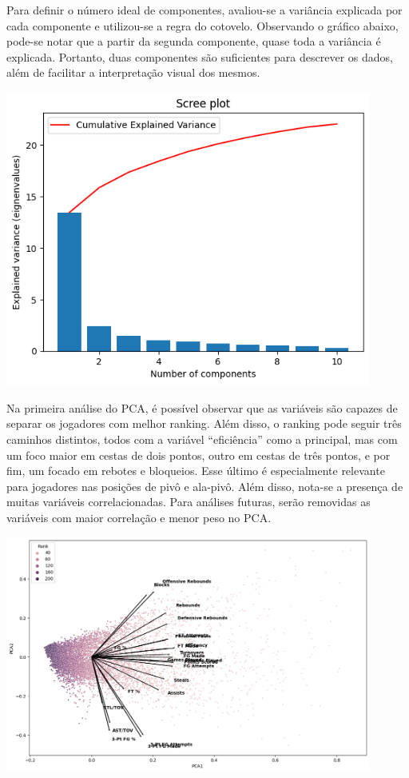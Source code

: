 \documentclass[
]{book}
\begin{document}
Para definir o número ideal de componentes, avaliou-se a variância explicada por cada componente e utilizou-se a regra do cotovelo. Observando o gráfico abaixo, pode-se notar que a partir da segunda componente, quase toda a variância é explicada. Portanto, duas componentes são suficientes para descrever os dados, além de facilitar a interpretação visual dos mesmos.

\includegraphics[width=0.9\textwidth,height=\textheight]{imagens/3.png}

Na primeira análise do PCA, é possível observar que as variáveis são capazes de separar os jogadores com melhor ranking. Além disso, o ranking pode seguir três caminhos distintos, todos com a variável ``eficiência'' como a principal, mas com um foco maior em cestas de dois pontos, outro em cestas de três pontos, e por fim, um focado em rebotes e bloqueios. Esse último é especialmente relevante para jogadores nas posições de pivô e ala-pivô. Além disso, nota-se a presença de muitas variáveis correlacionadas. Para análises futuras, serão removidas as variáveis com maior correlação e menor peso no PCA.

\includegraphics[width=0.9\textwidth,height=\textheight]{imagens/4.png}
\end{document}

